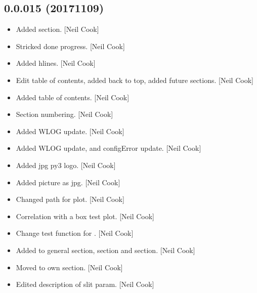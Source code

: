 \documentclass[a4paper,10pt,english]{report}
\begin{document}
\subsection{0.0.015 (2017\sphinxhyphen{}11\sphinxhyphen{}09)}
\label{\detokenize{misc/changelog:id554}}\begin{itemize}
\item {} 
Added  section. {[}Neil Cook{]}

\item {} 
Stricked done progress. {[}Neil Cook{]}

\item {} 
Added hlines. {[}Neil Cook{]}

\item {} 
Edit table of contents, added back to top, added future sections.
{[}Neil Cook{]}

\item {} 
Added table of contents. {[}Neil Cook{]}

\item {} 
Section numbering. {[}Neil Cook{]}

\item {} 
Added WLOG update. {[}Neil Cook{]}

\item {} 
Added WLOG update, and configError update. {[}Neil Cook{]}

\item {} 
Added jpg py3 logo. {[}Neil Cook{]}

\item {} 
Added picture as jpg. {[}Neil Cook{]}

\item {} 
Changed path for plot. {[}Neil Cook{]}

\item {} 
Correlation with a box test plot. {[}Neil Cook{]}

\item {} 
Change test function for . {[}Neil Cook{]}

\item {} 
Added to general section,  section and  section. {[}Neil
Cook{]}

\item {} 
Moved  to own section. {[}Neil Cook{]}

\item {} 
Edited description of slit param. {[}Neil Cook{]}

\end{itemize}
\end{document}
